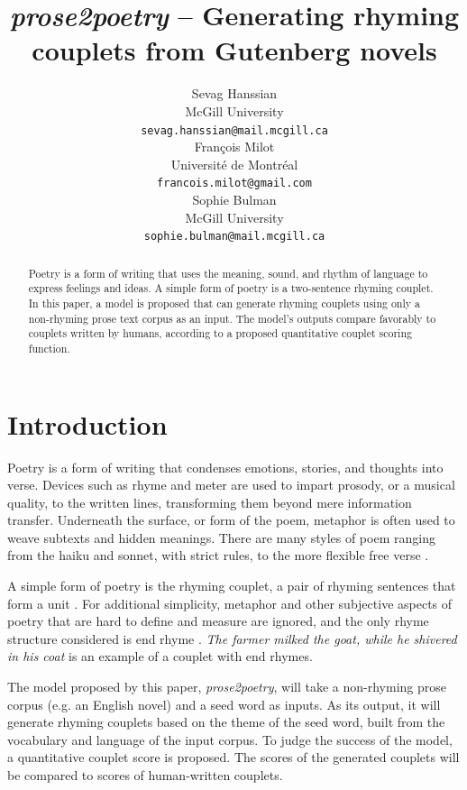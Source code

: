 \documentclass[11pt,a4paper]{article}
\title{\textit{prose2poetry} -- Generating rhyming couplets from Gutenberg novels}
\author{Sevag Hanssian \\
  McGill University \\
 \texttt{sevag.hanssian@mail.mcgill.ca}\\\And
  François Milot \\
  Université de Montréal \\
  \texttt{francois.milot@gmail.com}\\\AND Sophie Bulman \\
  McGill University \\
   \texttt{sophie.bulman@mail.mcgill.ca}}
\date{}
\begin{document}
\maketitle
\begin{abstract}
	Poetry is a form of writing that uses the meaning, sound, and rhythm of language to express feelings and ideas. A simple form of poetry is a two-sentence rhyming couplet. In this paper, a model is proposed that can generate rhyming couplets using only a non-rhyming prose text corpus as an input. The model's outputs compare favorably to couplets written by humans, according to a proposed quantitative couplet scoring function.
\end{abstract}

\section{Introduction}
\label{sec:intro}

Poetry is a form of writing that condenses emotions, stories, and thoughts into verse. Devices such as rhyme and meter are used to impart prosody, or a musical quality, to the written lines, transforming them beyond mere information transfer. Underneath the surface, or form of the poem, metaphor is often used to weave subtexts and hidden meanings. There are many styles of poem ranging from the haiku and sonnet, with strict rules, to the more flexible free verse \citep{poem_type}.

A simple form of poetry is the rhyming couplet, a pair of rhyming sentences that form a unit \cite{couplet_def}. For additional simplicity, metaphor and other subjective aspects of poetry that are hard to define and measure are ignored, and the only rhyme structure considered is end rhyme \cite{end_rhyme_def}. \textit{The farmer milked the goat, while he shivered in his coat} is an example of a couplet with end rhymes.

The model proposed by this paper, \textit{prose2poetry}, will take a non-rhyming prose corpus (e.g. an English novel) and a seed word as inputs. As its output, it will generate rhyming couplets based on the theme of the seed word, built from the vocabulary and language of the input corpus. To judge the success of the model, a quantitative couplet score is proposed. The scores of the generated couplets will be compared to scores of human-written couplets.

\end{document}

